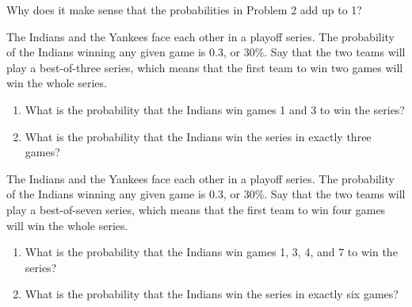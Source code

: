\documentclass{ximera}
\begin{document}
\begin{problem}
Why does it make sense that the probabilities in Problem 2 add up to 1?
\end{problem}

\begin{problem}
The Indians and the Yankees face each other in a playoff series.  The probability of the Indians winning any given game is 0.3, or 30\%.  Say that the two teams will play a best-of-three series, which means that the first team to win two games will win the whole series.

\begin{enumerate}
\item What is the probability that the Indians win games 1 and 3 to win the series?
\item What is the probability that the Indians win the series in exactly three games?
\end{enumerate}
\end{problem}

\begin{problem}
The Indians and the Yankees face each other in a playoff series.  The probability of the Indians winning any given game is 0.3, or 30\%.  Say that the two teams will play a best-of-seven series, which means that the first team to win four games will win the whole series.

\begin{enumerate}
\item What is the probability that the Indians win games 1, 3, 4, and 7 to win the series?
\item What is the probability that the Indians win the series in exactly six games?
\end{enumerate}
\end{problem}
\end{document}
